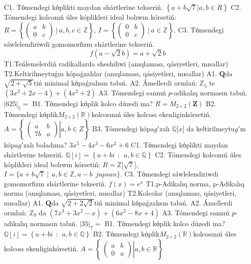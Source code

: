 C1. Tόmendegi kόplikti maydan shártlerine tekseriń. \(\left\{ a + b\sqrt{7}|a,b \in R \right\}\)
C2. Tómendegi kolconıń úles kóplikleri ideal bolıwın kórsetiń:
\(R = \left\{ \begin{pmatrix}
a & b \\
0 & c
\end{pmatrix}\ |\ a,b,c \in \mathbb{Z} \right\}\), \(I = \left\{ \begin{pmatrix}
0 & b \\
0 & c
\end{pmatrix}\ |\ a \in \mathbb{Z} \right\}\).
C3. Tόmendegi sáwlelendiriwdi gomomorfizm shártlerine tekseriń.
\[f\left( a - \sqrt{2}b \right) = a + \sqrt{2}b\]
T1.Teńlemelerdiń radikallarda sheshiliwi (anıqlaması, qásiyetleri, mısallar)
T2.Keltirilmeytuǵın kópaǵzalılar (anıqlaması, qásiyetleri, mısallar)
A1. \(\mathbf{Q}\)da \(\sqrt{2 + \sqrt{5}}\)tiń minimal kόpaǵzalısın tabıń.
A2. Ámellerdi orınlań: \(\mathbb{Z}_{5}\) te \(\left( 3x^{2} + 2x - 4 \right) + \left( 4x^{2} + 2 \right)\)
A3. Tómendegi sannıń \(p\)-adikalıq normasın tabıń. \(|625|_{5} =\)
B1. Tόmendegi kόplik kolco dúzedi ma? \(R = M_{2 \times 2}\left( \mathbf{Z} \right)\)
B2. Tόmendegi kόplik\(M_{2 \times 2}\left( \mathbb{R} \right)\)kolcosınıń úles kolcosı ekenliginkórsetiń. \(A = \left\{ \left. \ \begin{pmatrix}
a & b \\
7b & a
\end{pmatrix} \right|a,b \in Z \right\}\)
B3. Tómendegi kópa\(g'\)zalı \(\mathbb{Q\lbrack}x\rbrack\) da keltirilmeytu\(g'\)ın kópa\(g'\)zalı boladıma? \(3x^{5} - 4x^{3} - 6x^{2} + 6\)
C1. Tόmendegi kόplikti maydan shártlerine tekseriń. \(\mathbb{Q}\left\lfloor i \right\rfloor = \left\{ a + bi\ \ :\ \ a,b\mathbb{\in Q} \right\}\)
C2. Tómendegi kolconıń úles kóplikleri ideal bolıwın kórsetiń:
\(R\mathbb{= Z\lbrack}\sqrt{7}\rbrack\), \(I = \{ a + b\sqrt{7}\ |\ \ a,b \in \mathbb{Z,}a - b\ \ jupsan\}\).
C3. Tόmendegi sáwlelendiriwdi gomomorfizm shártlerine tekseriń. \(f(x) = e^{x}\)
T1.p-Adikalıq norma, p-Adikalıq norma (anıqlaması, qásiyetleri, mısallar)
T2.Kolcolar (anıqlaması, qásiyetleri, mısallar)
A1. \(\mathbf{Q}\)da \(\sqrt{2 + 2\sqrt{2}}\)tiń minimal kόpaǵzalısın tabıń.
A2. Ámellerdi orınlań: \(\mathbb{Z}_{9}\) da \(\left( 7x^{3} + 3x^{2} - x \right) + \left( 6x^{2} - 8x + 4 \right)\)
A3. Tómendegi sannıń \(p\)-adikalıq normasın tabıń. \(|35|_{7} =\)
B1. Tόmendegi kόplik kolco dúzedi ma? \(\mathbb{Q}\left\lfloor i \right\rfloor = \left\{ a + bi\ \ :\ \ a,b\mathbb{\in Q} \right\}\)
B2. Tόmendegi kόplik\(M_{2 \times 2}\left( \mathbb{R} \right)\)kolcosınıń úles kolcosı ekenliginkórsetiń. \(A = \left\{ \left. \ \begin{pmatrix}
a & b \\
0 & a
\end{pmatrix} \right|a,b\mathbb{\in R} \right\}\)
